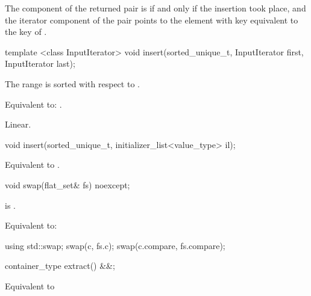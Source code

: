 \begin{codeblock}
\begin{codeblock}
\begin{codeblock}
\begin{addedblock}
\begin{itemdescr}
\pnum
\returns
The  component of the returned pair is  if and only if
the insertion took place, and the iterator component of the pair points to the
element with key equivalent to the key of .
\end{itemdescr}

%
\begin{itemdecl}
template <class InputIterator>
  void insert(sorted_unique_t, InputIterator first, InputIterator last);
\end{itemdecl}

\begin{itemdescr}
\pnum \expects
The range  is sorted with respect to .

\pnum \effects Equivalent to: .

\pnum \complexity Linear.
\end{itemdescr}

%
\begin{itemdecl}
void insert(sorted_unique_t, initializer_list<value_type> il);
\end{itemdecl}

\begin{itemdescr}
\pnum \effects Equivalent to .
\end{itemdescr}

%
\begin{itemdecl}
void swap(flat_set& fs) noexcept;
\end{itemdecl}

\begin{itemdescr}
\pnum \constraints {} is .

\pnum \effects Equivalent to:
\begin{codeblock}
using std::swap;
swap(c, fs.c);
swap(c.compare, fs.compare);
\end{codeblock}
\end{itemdescr}

%
\begin{itemdecl}
container_type extract() &&;
\end{itemdecl}

\begin{itemdescr}
\effects Equivalent to 
\end{itemdescr}


\end{addedblock}
\end{codeblock}
\end{codeblock}
\end{codeblock}
